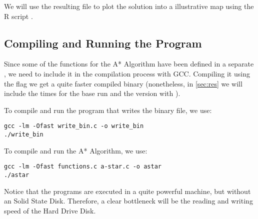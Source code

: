 We will use the resulting  file to plot the solution into a illustrative map using the R script .

\subsection{Compiling and Running the Program}
Since some of the functions for the A* Algorithm have been defined in a separate , we need to include it in the compilation process with GCC. Compiling it using the  flag we get a quite faster compiled binary (nonetheless, in \cref{sec:res} we will include the times for the base run and the version with ). 

To compile and run the program that writes the binary file, we use:
\begin{lstlisting}
gcc -lm -Ofast write_bin.c -o write_bin
./write_bin
\end{lstlisting}

To compile and run the A* Algorithm, we use:
\begin{lstlisting}
gcc -lm -Ofast functions.c a-star.c -o astar
./astar
\end{lstlisting}

Notice that the programs are executed in a quite powerful machine, but without an Solid State Disk. Therefore, a clear bottleneck will be the reading and writing speed of the Hard Drive Disk.
